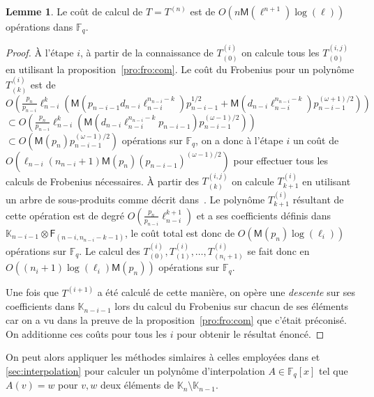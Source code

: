 \documentclass[10pt,a4paper]{book}
\theoremstyle{plain}
\theoremstyle{definition}
\newtheorem{lem}[thm]{Lemme}
\theoremstyle{definition}
\theoremstyle{definition}
\theoremstyle{definition}
\theoremstyle{remark}
\theoremstyle{remark}
\theoremstyle{definition}
\begin{document}
\begin{lem}\label{lem:interpolation:minpoly:ult}
  Le coût de calcul de $T=T^{(n)}$ est de $O(n\mathsf{M}(\ell^{n+1})\log(\ell))$
  opérations dans $\mathbb{F}_q$.
\end{lem}

\begin{proof}
  \`A l'étape $i$, à partir de la connaissance de $T^{(i)}_{(0)}$ on  calcule tous 
  les $T^{(i,j)}_{(0)}$ en utilisant la proposition~\ref{pro:fro:com}. Le coût du 
  Frobenius pour un polynôme $T^{(i)}_{(k)}$ est de 
  $O(\frac{p_n}{p_{n-i}}\ell_{n-i}^{k}(\mathsf{M}(p_{n-i-1}d_{n-i}\ell_{n-i}^{n_{n-i}-k})p_{n-i-1}^{1/2}+\mathsf{M}(d_{n-i}\ell_{n-i}^{n_{n-i}-k})p_{n-i-1}^{(\omega+1)/2}))$ 
  $\subset O(\frac{p_n}{p_{n-i}}\ell_{n-i}^{k}(\mathsf{M}(d_{n-i}\ell_{n-i}^{n_{n-i}-k}p_{n-i-1})p_{n-i-1}^{(\omega-1)/2}))$ 
  $\subset O(\mathsf{M}(p_n)p_{n-i-1}^{(\omega - 1)/2})$ opérations sur 
  $\mathbb{F}_q$, on a donc à l'étape $i$ un coût de $O(\ell_{n-i}(n_{n-i}+1)\mathsf{M}(p_n)(p_{n-i-1})^{(\omega - 1)/2})$ 
  pour effectuer tous les calculs de Frobenius nécessaires.
  \`A partir des $T^{(i,j)}_{(k)}$ on calcule $T^{(i)}_{k+1}$ en utilisant un arbre de 
  sous-produits comme décrit dans~\cite[Lemma~10.4]{vzGJG03}. Le polynôme 
  $T^{(i)}_{k+1}$ résultant de cette opération est de degré 
  $O(\frac{p_n}{p_{n-i}}\ell_{n-i}^{k+1})$ et a ses 
  coefficients définis dans $\mathbb{K}_{n-i-1} \otimes \mathsf{F}_{(n-i,n_{n-i}-k-1)}$,
  le coût total est donc de 
  $O(\mathsf{M}(p_n)\log(\ell_{i}))$ opérations sur $\mathbb{F}_q$. 
  Le calcul des $T^{(i)}_{(0)},T^{(i)}_{(1)}, \dots, T^{(i)}_{(n_i+1)}$ se fait
  donc en $O((n_i+1) \log(\ell_{i})\mathsf{M}(p_n))$ opérations sur 
  $\mathbb{F}_{q}$.
  
  
  Une fois que $T^{(i+1)}$ a été calculé de cette manière, on opère une 
  \emph{descente} sur ses coefficients dans $\mathbb{K}_{n-i-1}$ lors du calcul
  du Frobenius sur chacun de ses éléments car on a vu dans la preuve de la 
  proposition~\ref{pro:fro:com} que c'était préconisé.
  On additionne ces coûts pour tous les $i$ pour obtenir le résultat 
  énoncé. 
\end{proof}
 
 On peut alors appliquer les méthodes simlaires à celles employées dans 
 \cite{DeFeo10} et \ref{sec:interpolation} pour calculer un polynôme 
 d'interpolation $A \in \mathbb{F}_q[x]$ tel que $A(v)=w$ pour $v,w$ deux 
 éléments de $\mathbb{K}_{n} \setminus \mathbb{K}_{n-1}$.
 
\end{document}
